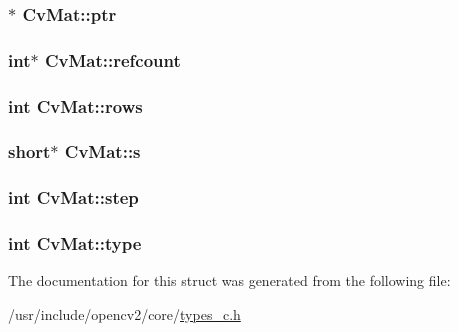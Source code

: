 \hypertarget{structCvMat_a788228568bc88fbfd4ccae75a9d01585}{
\subsubsection[{ptr}]{$\ast$ Cv\-Mat\-::ptr}}\label{structCvMat_a788228568bc88fbfd4ccae75a9d01585}
\hypertarget{structCvMat_af54d7348d15fd7475d85adf0d7e71439}{
\subsubsection[{refcount}]{\setlength{\rightskip}{0pt plus 5cm}int$\ast$ Cv\-Mat\-::refcount}}\label{structCvMat_af54d7348d15fd7475d85adf0d7e71439}
\hypertarget{structCvMat_a1048c94607682732dc75d367f7777222}{
\subsubsection[{rows}]{\setlength{\rightskip}{0pt plus 5cm}int Cv\-Mat\-::rows}}\label{structCvMat_a1048c94607682732dc75d367f7777222}
\hypertarget{structCvMat_a90df732557ba0842a10b47bc85f8dcbe}{
\subsubsection[{s}]{\setlength{\rightskip}{0pt plus 5cm}short$\ast$ Cv\-Mat\-::s}}\label{structCvMat_a90df732557ba0842a10b47bc85f8dcbe}
\hypertarget{structCvMat_a79ac05ef6fed1529e6d4b444c7c5234c}{
\subsubsection[{step}]{\setlength{\rightskip}{0pt plus 5cm}int Cv\-Mat\-::step}}\label{structCvMat_a79ac05ef6fed1529e6d4b444c7c5234c}
\hypertarget{structCvMat_acb651f3eaeb6ee5e9c23308a91aba936}{
\subsubsection[{type}]{\setlength{\rightskip}{0pt plus 5cm}int Cv\-Mat\-::type}}\label{structCvMat_acb651f3eaeb6ee5e9c23308a91aba936}


The documentation for this struct was generated from the following file\-:\begin{DoxyCompactItemize}
\item 
/usr/include/opencv2/core/\hyperlink{core_2types__c_8h}{types\-\_\-c.\-h}\end{DoxyCompactItemize}
